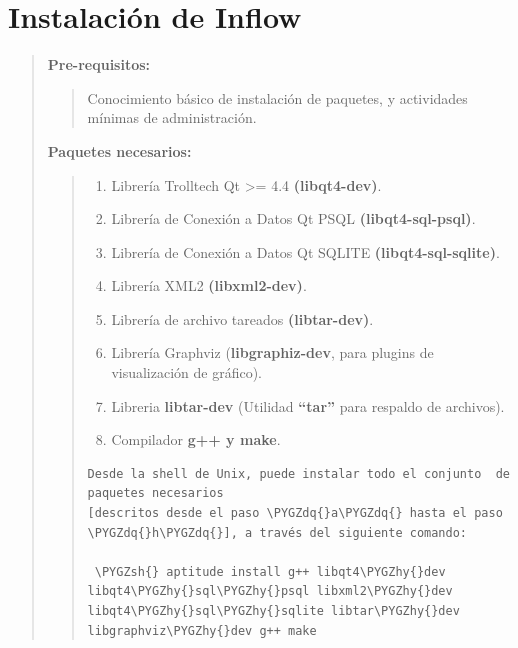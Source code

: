 \documentclass[letterpaper,11pt,spanish]{sphinxmanual}
\def\PYGZsh{\char`\#}
\def\PYGZhy{\char`\-}
\def\PYGZdq{\char`\"}
\begin{document}
\chapter{Instalación de Inflow}
\label{_templates/Contenido7/inflow:instalacion-de-inflow}\label{_templates/Contenido7/inflow::doc}\begin{quote}

\textbf{Pre-requisitos:}
\begin{quote}

Conocimiento básico de instalación de paquetes,  y actividades mínimas de administración.
\end{quote}

\textbf{Paquetes necesarios:}
\begin{quote}
\begin{enumerate}
\item {} 
Librería Trolltech Qt \textgreater{}= 4.4  \textbf{(libqt4-dev)}.

\item {} 
Librería de Conexión a Datos Qt PSQL \textbf{(libqt4-sql-psql)}.

\item {} 
Librería de Conexión a Datos Qt SQLITE \textbf{(libqt4-sql-sqlite)}.

\item {} 
Librería XML2 \textbf{(libxml2-dev)}.

\item {} 
Librería de archivo tareados \textbf{(libtar-dev)}.

\item {} 
Librería Graphviz (\textbf{libgraphiz-dev}, para plugins de visualización de gráfico).

\item {} 
Libreria \textbf{libtar-dev} (Utilidad \textbf{``tar''} para respaldo de archivos).

\item {} 
Compilador \textbf{g++ y make}.

\end{enumerate}

\begin{Verbatim}[commandchars=\\\{\}]
Desde la shell de Unix, puede instalar todo el conjunto  de  paquetes necesarios
[descritos desde el paso \PYGZdq{}a\PYGZdq{} hasta el paso \PYGZdq{}h\PYGZdq{}], a través del siguiente comando:

 \PYGZsh{} aptitude install g++ libqt4\PYGZhy{}dev libqt4\PYGZhy{}sql\PYGZhy{}psql libxml2\PYGZhy{}dev  libqt4\PYGZhy{}sql\PYGZhy{}sqlite libtar\PYGZhy{}dev libgraphviz\PYGZhy{}dev g++ make
\end{Verbatim}


\end{quote}
\end{quote}
\end{document}
